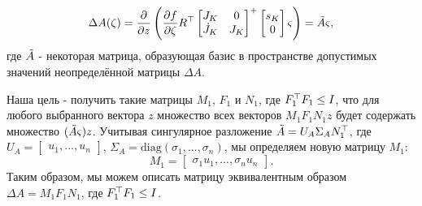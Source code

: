 \begin{equation}
	\Delta {A}(\zeta) = 
	\frac{\partial}{\partial z} 
	\left (
	\frac{\partial f}{\partial \zeta} {R}^\top 
	\begin{bmatrix}
		{J}_K & 0 \\ \dot{{J}}_K & {J}_K
	\end{bmatrix}^+ 
	\begin{bmatrix}
		s_K \\ 0
	\end{bmatrix} \varsigma 
	\right )
	= \Tilde{A} \varsigma,
\end{equation}
%
где $\Tilde{A}$ - некоторая матрица, образующая базис в пространстве допустимых значений неопределённой матрицы $\Delta {A}$.

Наша цель - получить такие матрицы ${M}_1$, ${F}_1$ и ${N}_1$, где ${F}_1^\top {F}_1 \leq {I}$, что для любого выбранного вектора $z$ множество всех векторов ${M}_1 {F}_1 {N}_1 z$ будет содержать множество $(\Tilde{A} \varsigma) z$. Учитывая сингулярное разложение $\Tilde{A} = {U}_A {\Sigma}_A {N}_1^\top$, где 
${U}_A = \begin{bmatrix}
	{u}_1, ..., {u}_n
\end{bmatrix}$, 
${\Sigma}_A = \text{diag}(\sigma_1, ..., \sigma_n)$, мы определяем новую матрицу ${M}_1$:
%
\begin{equation}
	{M}_1 = 
	\begin{bmatrix}
		\sigma_1{u}_1, ..., \sigma_n{u}_n
	\end{bmatrix}.
\end{equation}
Таким образом, мы можем описать матрицу эквивалентным образом $\Delta {A} = {M}_1 {F}_1 {N}_1$, где ${F}_1^\top{F}_1\leq {I}$.

\FloatBarrier
